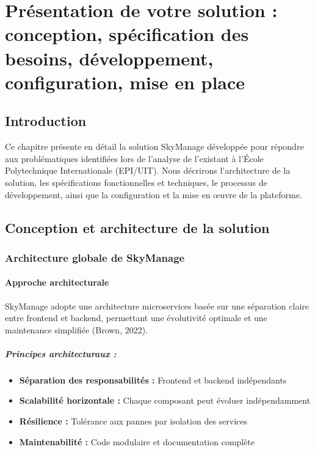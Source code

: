 \chapter{Présentation de votre solution : conception, spécification des besoins, développement, configuration, mise en place}

\section{Introduction}

Ce chapitre présente en détail la solution SkyManage développée pour répondre aux problématiques identifiées lors de l'analyse de l'existant à l'École Polytechnique Internationale (EPI/UIT). Nous décrirons l'architecture de la solution, les spécifications fonctionnelles et techniques, le processus de développement, ainsi que la configuration et la mise en œuvre de la plateforme.

\section{Conception et architecture de la solution}

\subsection{Architecture globale de SkyManage}

\subsubsection{Approche architecturale}
SkyManage adopte une architecture microservices basée sur une séparation claire entre frontend et backend, permettant une évolutivité optimale et une maintenance simplifiée (Brown, 2022).

\paragraph{Principes architecturaux :}
\begin{itemize}
    \item \textbf{Séparation des responsabilités :} Frontend et backend indépendants
    \item \textbf{Scalabilité horizontale :} Chaque composant peut évoluer indépendamment
    \item \textbf{Résilience :} Tolérance aux pannes par isolation des services
    \item \textbf{Maintenabilité :} Code modulaire et documentation complète
\end{itemize}

